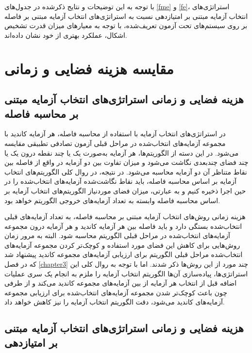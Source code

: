 با توجه به این توضیحات و نتایج ذکرشده در جدول‌های \ref{fme} و \ref{fe}، استراتژی‌های انتخاب آزمایه مبتنی بر امتیازدهی نسبت به استراتژی‌های انتخاب آزمایه مبتنی بر فاصله بر روی سیستم‌های تحت آزمون تعریف‌شده، با توجه به معیارهای میزان قدرت تشخیص اشکال، عملکرد بهتری از خود نشان داده‌اند.

\section{مقایسه هزینه فضایی و زمانی}

\subsection{هزینه فضایی و زمانی استراتژی‌های انتخاب آزمایه مبتنی بر محاسبه فاصله}

در استراتژی‌های انتخاب آزمایه با استفاده از محاسبه فاصله، هر آزمایه کاندید با مجموعه آزمایه‌های انتخاب‌شده در مراحل قبلی آزمون تصادفی تطبیقی مقایسه می‌شود. در این دسته از الگوریتم‌ها، هر آزمایه به‌صورت یک یا چند نقطه درون یک یا چند فضای چندبعدی نگاشت می‌شود و میزان تفاوت بین دو آزمایه در واقع از فاصله بین نقاط متناظر آن دو آزمایه محاسبه می‌شود. در نتیجه، در روال کلی الگوریتم‌های انتخاب آزمایه بر اساس محاسبه فاصله، باید نقاط نگاشت‌شده آزمایه‌های انتخاب‌شده را در حین اجرا ذخیره کنیم و به عبارتی، میزان فضای موردنیاز الگوریتم‌های انتخاب آزمایه بر اساس محاسبه فاصله وابسته به تعداد آزمایه‌های خروجی الگوریتم خواهد بود.

هزینه زمانی روش‌های انتخاب آزمایه مبتنی بر محاسبه فاصله، به تعداد آزمایه‌های قبلی انتخاب‌شده بستگی دارد و باید فاصله بین هر آزمایه کاندید و هر آزمایه درون مجموعه آزمایه‌های انتخاب‌شده در مراحل قبلی الگوریتم محاسبه شود. البته به مرور زمان روش‌هایی برای کاهش این فضای مورد استفاده و کوچک‌تر کردن مجموعه آزمایه‌های انتخاب‌شده مراحل قبلی الگوریتم برای ارزیابی آزمایه‌های مجموعه کاندید پیشنهاد شد که در فصل \ref{chapter3} چند مورد از این روش‌ها ذکر شدند. اما با توجه به روال کلی این استراتژی‌ها، پیاده‌سازی آن‌ها الگوریتم انتخاب آزمایه را ملزم به انجام یک سری عملیات اضافه قبل از انتخاب هر آزمایه از بین آزمایه‌های مجموعه کاندید می‌کند و از طرفی چون باعث کوچک‌تر شدن مجموعه آزمایه‌های انتخاب‌شده برای ارزیابی مجموعه آزمایه‌های کاندید می‌شود، دقت الگوریتم انتخاب آزمایه را نیز کاهش خواهد داد.

\subsection{هزینه فضایی و زمانی استراتژی‌های انتخاب آزمایه مبتنی بر امتیازدهی}

